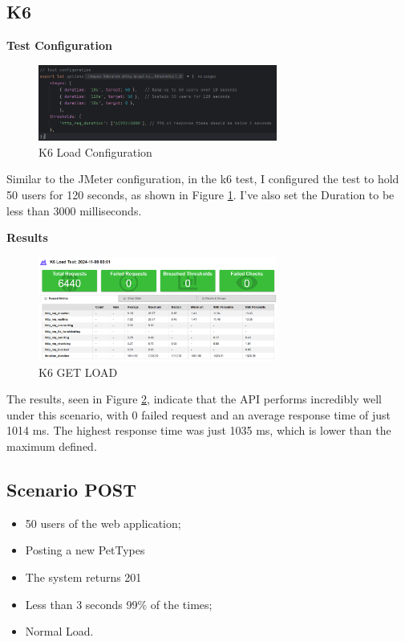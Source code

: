 \documentclass[a4paper,11pt,openright,BCOR=15mm]{scrbook}
\begin{document}
		\subsection{K6}


		\textbf{Test Configuration}
		\begin{figure}[H]
			\centering
			\includegraphics[width=0.7\textwidth]{figs/Performance/Test Configuration/K6-LOAD.png}
			\caption{K6 Load Configuration}
			\label{fig:K6-LOAD}
		\end{figure}
		Similar to the JMeter configuration, in the k6 test, I configured the test to hold 50 users for 120 seconds, as shown in Figure \ref{fig:K6-LOAD}. I've also set the Duration to be less than 3000 milliseconds.
		

		\textbf{Results}
		\begin{figure}[H]
			\centering
			\includegraphics[width=0.7\textwidth]{figs/Performance/Results/K6 GET LOAD.png}
			\caption{K6 GET LOAD}
			\label{fig:K6-GET-LOAD}
		\end{figure}
		The results, seen in Figure \ref{fig:K6-GET-LOAD}, indicate that the API performs incredibly well under this scenario, with 0 failed request and an average response time of just 1014 ms. The highest response time was just 1035 ms, which is lower than the maximum defined.

		\subsection{Scenario POST}
		\begin{itemize}
			\item 50 users of the web application;
	        \item Posting a new PetTypes
			\item The system returns 201
			\item Less than 3 seconds 99\% of the times;
			\item Normal Load.
		\end{itemize}
\end{document}
